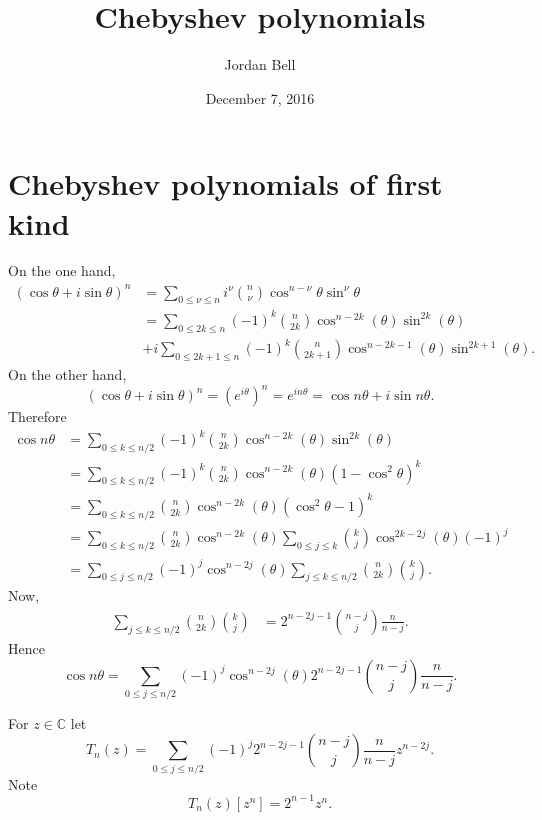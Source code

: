 \documentclass{article}
\theoremstyle{definition}
\begin{document}
\title{Chebyshev polynomials}
\author{Jordan Bell}
\date{December 7, 2016}

\maketitle

\section{Chebyshev polynomials of first kind}
On the one hand, 
\begin{align*}
(\cos \theta + i \sin \theta)^n&=\sum_{0 \leq \nu \leq n} i^\nu \binom{n}{\nu} \cos^{n-\nu} \theta \sin^\nu \theta\\
&=\sum_{0 \leq 2k \leq n} (-1)^k \binom{n}{2k}\cos^{n-2k}(\theta) \sin^{2k}(\theta)\\
&+i\sum_{0 \leq 2k+1 \leq n}  (-1)^k \binom{n}{2k+1}\cos^{n-2k-1}(\theta) \sin^{2k+1}(\theta).
\end{align*}
On the other hand,
\[
(\cos \theta+i\sin \theta)^n = (e^{i\theta})^n = e^{in\theta} = \cos n\theta + i\sin n\theta.
\]
Therefore
\begin{align*}
\cos n\theta&=\sum_{0 \leq k \leq n/2} (-1)^k \binom{n}{2k}\cos^{n-2k}(\theta) \sin^{2k}(\theta)\\
&=\sum_{0 \leq k \leq n/2} (-1)^k \binom{n}{2k}\cos^{n-2k}(\theta) (1-\cos^2 \theta)^k\\
&=\sum_{0 \leq k \leq n/2} \binom{n}{2k}\cos^{n-2k}(\theta) (\cos^2 \theta-1)^k\\
&=\sum_{0 \leq k \leq n/2} \binom{n}{2k}\cos^{n-2k}(\theta) \sum_{0 \leq j \leq k} \binom{k}{j} \cos^{2k-2j}(\theta)  (-1)^j\\
&=\sum_{0 \leq j \leq n/2} (-1)^j \cos^{n-2j}(\theta) \sum_{j \leq k \leq n/2} \binom{n}{2k} \binom{k}{j}.
\end{align*}
Now,
\begin{align*}
\sum_{j \leq k \leq n/2} \binom{n}{2k} \binom{k}{j}&=
2^{n-2j-1} \binom{n-j}{j} \frac{n}{n-j}.
\end{align*}
Hence
\[
\cos n\theta = \sum_{0 \leq j \leq n/2} (-1)^j \cos^{n-2j}(\theta)2^{n-2j-1} \binom{n-j}{j} \frac{n}{n-j}.
\]

For $z \in \mathbb{C}$ let 
\begin{equation}
T_n(z) =  \sum_{0 \leq j \leq n/2} (-1)^j 2^{n-2j-1} \binom{n-j}{j} \frac{n}{n-j} z^{n-2j}.
\label{Tn}
\end{equation}
Note
\[
T_n(z)[z^n] = 2^{n-1} z^n.
\]
\end{document}
